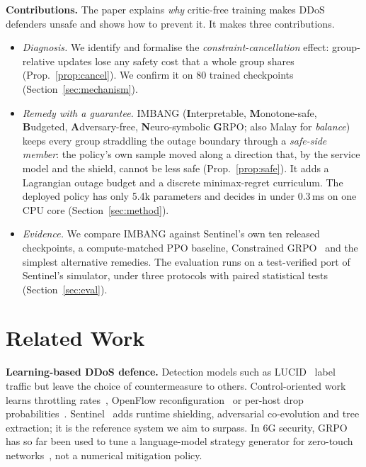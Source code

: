 \documentclass[conference]{IEEEtran}
\begin{document}
\textbf{Contributions.} The paper explains \emph{why} critic-free training makes DDoS defenders unsafe and shows how to prevent it. It makes three contributions.
\begin{itemize}
\item \emph{Diagnosis.} We identify and formalise the \emph{constraint-cancellation} effect: group-relative updates lose any safety cost that a whole group shares (Prop.~\ref{prop:cancel}). We confirm it on 80 trained checkpoints (Section~\ref{sec:mechanism}).
\item \emph{Remedy with a guarantee.} IMBANG (\textbf{I}nterpretable, \textbf{M}onotone-safe, \textbf{B}udgeted, \textbf{A}dversary-free, \textbf{N}euro-symbolic \textbf{G}RPO; also Malay for \emph{balance}) keeps every group straddling the outage boundary through a \emph{safe-side member}: the policy's own sample moved along a direction that, by the service model and the shield, cannot be less safe (Prop.~\ref{prop:safe}). It adds a Lagrangian outage budget and a discrete minimax-regret curriculum. The deployed policy has only 5.4k parameters and decides in under 0.3\,ms on one CPU core (Section~\ref{sec:method}).
\item \emph{Evidence.} We compare IMBANG against Sentinel's own ten released checkpoints, a compute-matched PPO baseline, Constrained GRPO~\cite{girgis2026cgrpo} and the simplest alternative remedies. The evaluation runs on a test-verified port of Sentinel's simulator, under three protocols with paired statistical tests (Section~\ref{sec:eval}).
\end{itemize}

\section{Related Work}
\textbf{Learning-based DDoS defence.} Detection models such as LUCID~\cite{doriguzzi2020lucid} label traffic but leave the choice of countermeasure to others. Control-oriented work learns throttling rates~\cite{malialis2015distributed}, OpenFlow reconfiguration~\cite{liu2018drlddos,akbari2020atmos} or per-host drop probabilities~\cite{simpson2020perhost}. Sentinel~\cite{alfatemi2026sentinel} adds runtime shielding, adversarial co-evolution and tree extraction; it is the reference system we aim to surpass. In 6G security, GRPO has so far been used to tune a language-model strategy generator for zero-touch networks~\cite{cao2025secloop}, not a numerical mitigation policy.
\end{document}
